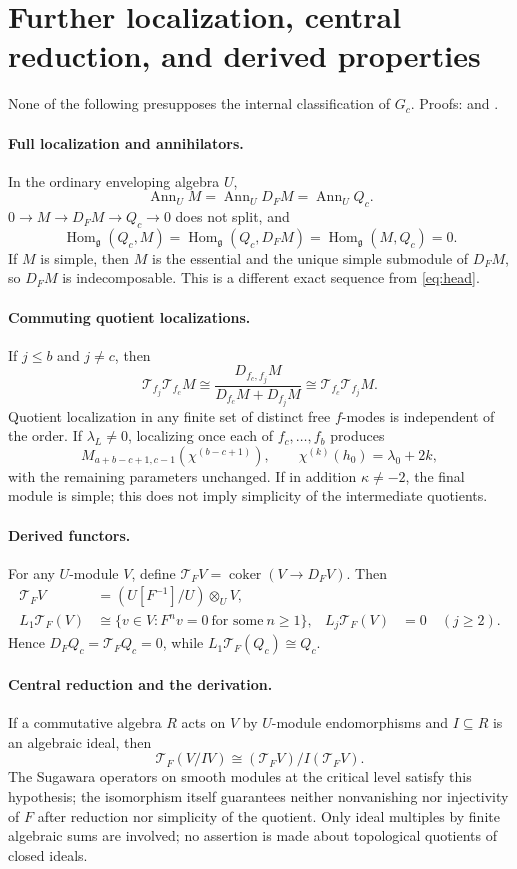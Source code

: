 \documentclass[11pt,a4paper]{article}
\theoremstyle{upright}
\newcommand{\g}{\mathfrak g}
\newcommand{\T}{\mathcal T}
\DeclareMathOperator{\Ann}{Ann}
\DeclareMathOperator{\Hom}{Hom}
\DeclareMathOperator{\coker}{coker}
\begin{document}
\section{Further localization, central reduction, and derived properties}

None of the following presupposes the internal classification of $G_c$.
Proofs: \cite[Sections 8--10]{Unified} and \cite[Section 5]{Addendum}.

\paragraph{Full localization and annihilators.}
In the ordinary enveloping algebra $U$,
\[
\Ann_U M=\Ann_U D_FM=\Ann_U Q_c.
\]
$0\to M\to D_FM\to Q_c\to0$ does not split, and
\[
\Hom_\g(Q_c,M)=\Hom_\g(Q_c,D_FM)=\Hom_\g(M,Q_c)=0.
\]
If $M$ is simple, then $M$ is the essential and the unique simple submodule
of $D_FM$, so $D_FM$ is indecomposable. This is a different exact sequence
from \eqref{eq:head}.

\paragraph{Commuting quotient localizations.}
If $j\le b$ and $j\ne c$, then
\[
\T_{f_j}\T_{f_c}M\cong
\frac{D_{f_c,f_j}M}{D_{f_c}M+D_{f_j}M}
\cong\T_{f_c}\T_{f_j}M.
\]
Quotient localization in any finite set of distinct free $f$-modes is
independent of the order. If $\lambda_L\ne0$, localizing once each of
$f_c,\ldots,f_b$ produces
\[
M_{a+b-c+1,c-1}(\chi^{(b-c+1)}),\qquad
\chi^{(k)}(h_0)=\lambda_0+2k,
\]
with the remaining parameters unchanged. If in addition $\kappa\ne-2$, the
final module is simple; this does not imply simplicity of the intermediate
quotients.

\paragraph{Derived functors.}
For any $U$-module $V$, define $\T_FV=\coker(V\to D_FV)$. Then
\[
\begin{aligned}
\T_FV&=(U[F^{-1}]/U)\otimes_UV,\\
L_1\T_F(V)&\cong\{v\in V:F^nv=0\ \text{for some}\ n\ge1\},
&L_j\T_F(V)&=0\quad(j\ge2).
\end{aligned}
\]
Hence $D_FQ_c=\T_FQ_c=0$, while $L_1\T_F(Q_c)\cong Q_c$.

\paragraph{Central reduction and the derivation.}
If a commutative algebra $R$ acts on $V$ by $U$-module endomorphisms and
$I\subseteq R$ is an algebraic ideal, then
\[
\T_F(V/IV)\cong(\T_FV)/I(\T_FV).
\]
The Sugawara operators on smooth modules at the critical level satisfy this
hypothesis; the isomorphism itself guarantees neither nonvanishing nor
injectivity of $F$ after reduction nor simplicity of the quotient. Only
ideal multiples by finite algebraic sums are involved; no assertion is made
about topological quotients of closed ideals.
\end{document}
